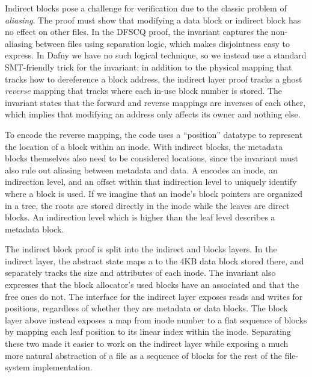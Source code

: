 Indirect blocks pose a challenge for verification due to the classic problem of
\emph{aliasing}. The proof must show that modifying a data block or indirect
block has no effect on other files. In the DFSCQ proof, the invariant
captures the non-aliasing between files using separation logic, which makes
disjointness easy to express. In Dafny we have no such logical
technique, so we instead use a standard SMT-friendly trick for the invariant: in
addition to the physical mapping that tracks how to dereference a block address,
the indirect layer proof tracks a ghost \emph{reverse} mapping that tracks where
each in-use block number is stored. The invariant states that the forward and reverse
mappings are inverses of each other, which implies that modifying an address
only affects its owner and nothing else.

To encode the reverse mapping, the code uses a ``position'' datatype  to
represent the location of a block within an inode. With indirect blocks, the
metadata blocks themselves also need to be considered locations, since the
invariant must also rule out aliasing between metadata and data. A
 encodes an inode, an indirection level, and an offset within
that indirection level to uniquely identify where a block is used. If we imagine
that an inode's block pointers are organized in a tree, the roots are stored
directly in the inode while the leaves are direct blocks. An indirection level
which is higher than the leaf level describes a metadata block.

The indirect block proof is split into the indirect and blocks layers. In the
indirect layer, the abstract state maps a  to the 4KB data block stored there, and separately
tracks the size and attributes of each inode. The invariant also expresses that
the block allocator's used blocks have an associated  and that the free
ones do not. The interface for the indirect layer exposes reads and writes for
positions, regardless of whether they are metadata or data blocks. The block
layer above instead exposes a map from inode number to a flat sequence of blocks by
mapping each leaf position to its linear index within the inode. Separating
these two made it easier to work on the indirect layer while exposing a much
more natural abstraction of a file as a sequence of blocks for the rest of the
file-system implementation.


